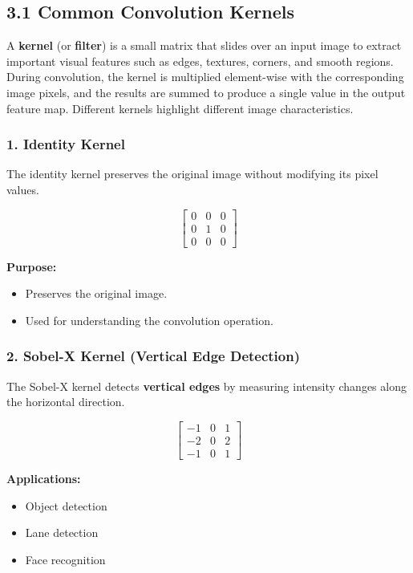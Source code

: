 \documentclass[11pt]{article}
\begin{document}
\subsection*{3.1 Common Convolution Kernels}

A \textbf{kernel} (or \textbf{filter}) is a small matrix that slides over
an input image to extract important visual features such as edges,
textures, corners, and smooth regions. During convolution, the kernel is
multiplied element-wise with the corresponding image pixels, and the
results are summed to produce a single value in the output feature map.
Different kernels highlight different image characteristics.

\subsubsection*{1. Identity Kernel}

The identity kernel preserves the original image without modifying its
pixel values.

\[
\begin{bmatrix}
0 & 0 & 0\\
0 & 1 & 0\\
0 & 0 & 0
\end{bmatrix}
\]

\textbf{Purpose:}
\begin{itemize}
\item Preserves the original image.
\item Used for understanding the convolution operation.
\end{itemize}

\subsubsection*{2. Sobel-X Kernel (Vertical Edge Detection)}

The Sobel-X kernel detects \textbf{vertical edges} by measuring intensity
changes along the horizontal direction.

\[
\begin{bmatrix}
-1 & 0 & 1\\
-2 & 0 & 2\\
-1 & 0 & 1
\end{bmatrix}
\]

\textbf{Applications:}
\begin{itemize}
\item Object detection
\item Lane detection
\item Face recognition
\end{itemize}
\end{document}
